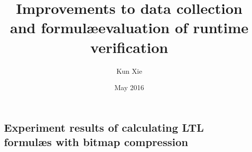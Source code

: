 \documentclass[times,twoside,memoire]{uqac-these}
\theoremstyle{definition}
\newcommand{\UqacTheseTitre}{Improvements to data collection and formul\ae evaluation of runtime verification}
\newcommand{\UqacTheseAuteur}{Kun Xie}
\newcommand{\UqacTheseDate}{May 2016}
\begin{document}
  
\title{\UqacTheseTitre}
\author{\UqacTheseAuteur}
\date{\UqacTheseDate}
\thispagestyle{empty}
\maketitle

\frontmatter

\doublespacing




\singlespacing
\cleardoublepage
\pdfbookmark{\contentsname}{\contentsname}
\label{\contentsname}
\tableofcontents
\newpage

\label{\listfigurename}
\listoffigures
\newpage

\label{\listtablename}
\listoftables
\newpage

\mainmatter
\doublespacing
% 







% 

\begin{appendices}
\chapter{Experiment results of calculating LTL formul\ae{}s with bitmap compression}
\label{appendixa}

\end{appendices}

\backmatter
% 

\clearpage
{}



\end{document}
